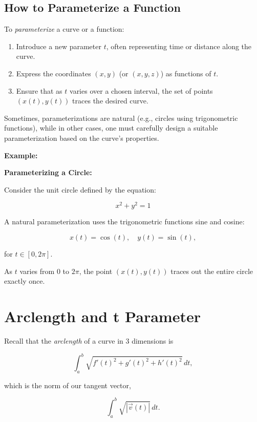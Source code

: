 \subsection{How to Parameterize a Function}

To \emph{parameterize} a curve or a function:

\begin{enumerate}

    \item Introduce a new parameter \(t\), often representing time or distance along the curve.

    \item Express the coordinates \( (x, y) \) (or \( (x, y, z) \)) as functions of \(t\).

    \item Ensure that as \(t\) varies over a chosen interval, the set of points \( (x(t), y(t)) \) 
         traces the desired curve.

\end{enumerate}

Sometimes, parameterizations are natural (e.g., circles using trigonometric functions), while in other 
cases, one must carefully design a suitable parameterization based on the curve's properties.

\textbf{Example:}

\textbf{Parameterizing a Circle:}  

Consider the unit circle defined by the equation:

\[
    x^2 + y^2 = 1
\]

A natural parameterization uses the trigonometric functions sine and cosine:

\[
    x(t) = \cos(t), \quad y(t) = \sin(t),
\]

for \( t \in [0, 2\pi] \).  

As \(t\) varies from \( 0 \) to \( 2\pi \), the point \( (x(t), y(t)) \) traces out the entire circle 
exactly once.

\section{Arclength and t Parameter}

Recall that the \emph{arclength} of a curve in 3 dimensions is

\[
    \int_{a}^{b} \sqrt{{f'(t)}^2 + {g'(t)}^2 + {h'(t)}^2} \, dt,
\]

which is the norm of our tangent vector,

\[
    \int_{a}^{b} \sqrt{|\vec{v}(t)|} \, dt.
\]

